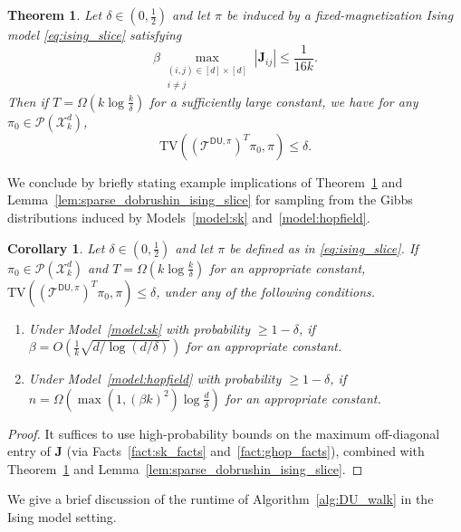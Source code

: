 \documentclass[11pt]{article}
\newtheorem{theorem}{Theorem}
\newtheorem{corollary}{Corollary}
\newcommand{\half}{\frac{1}{2}}
\newcommand{\1}{\mathbf{1}}
\newcommand{\0}{\mathbf{0}}
\newcommand{\Abs}[1]{\left|#1\right|}
\newcommand{\TV}[1]{\mathrm{TV}\left(#1\right)}
\newcommand{\TVs}[1]{\mathrm{TV}(#1)}
\newcommand{\mj}{{\mathbf{J}}}
\newcommand{\calP}{{\mathcal{P}}}
\newcommand{\calT}{{\mathcal{T}}}
\newcommand{\calX}{{\mathcal{X}}}
\newcommand{\TDU}[1]{\calT^{\mathsf{DU}, #1}}
\begin{document}
\begin{theorem}\label{thm:fast_mixing_slice_general}
Let $\delta \in (0, \half)$ and let $\pi$ be induced by a fixed-magnetization Ising model \eqref{eq:ising_slice} satisfying
\begin{equation}\label{eq:offdiag_bound}\beta \max_{\substack{(i, j) \in [d] \times [d] \\ i \neq j}} \Abs{\mj_{ij}} \le \frac 1 {16k}.\end{equation}
Then if $T = \Omega(k \log \frac k \delta)$ for a sufficiently large constant, we have for any $\pi_0 \in \calP(\calX^d_k)$,
\[\TV{(\TDU{\pi})^T \pi_0, \pi} \le \delta.\]
\end{theorem}

We conclude by briefly stating example implications of Theorem~\ref{thm:fast_mixing_slice_general} and Lemma~\ref{lem:sparse_dobrushin_ising_slice} for sampling from the Gibbs distributions induced by Models~\ref{model:sk} and~\ref{model:hopfield}.

\begin{corollary}\label{cor:ising_fm_gen}
Let $\delta \in (0, \half)$ and let $\pi$ be defined as in \eqref{eq:ising_slice}. If $\pi_0 \in \calP(\calX^d_k)$ and $T = \Omega(k \log \frac k \delta)$ for an appropriate constant, $\TVs{(\TDU{\pi})^T\pi_0, \pi} \le \delta$, under any of the following conditions.
\begin{enumerate}
\item Under Model~\ref{model:sk} with probability $\ge 1 - \delta$, if $\beta = O(\frac 1 k\sqrt{d/\log(d/\delta)})$ for an appropriate constant.\label{item:gen_ising_2}
\item Under Model~\ref{model:hopfield} with probability $\ge 1 - \delta$, if $n = \Omega(\max(1, (\beta k)^2) \log \frac d \delta)$ for an appropriate constant.\label{item:gen_ising_3}
\end{enumerate}

\end{corollary}
\begin{proof}
It suffices to use high-probability bounds on the maximum off-diagonal entry of $\mj$ (via Facts~\ref{fact:sk_facts} and~\ref{fact:ghop_facts}), combined with Theorem~\ref{thm:fast_mixing_slice_general} and Lemma~\ref{lem:sparse_dobrushin_ising_slice}.
\end{proof}

We give a brief discussion of the runtime of Algorithm~\ref{alg:DU_walk} in the Ising model setting.
\end{document}
